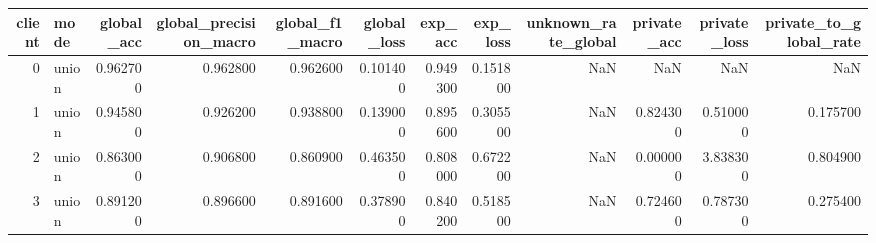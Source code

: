 \begin{tabular}{rlrrrrrrrrrr}
\toprule
client & mode & global_acc & global_precision_macro & global_f1_macro & global_loss & exp_acc & exp_loss & unknown_rate_global & private_acc & private_loss & private_to_global_rate \\
\midrule
0 & union & 0.962700 & 0.962800 & 0.962600 & 0.101400 & 0.949300 & 0.151800 & NaN & NaN & NaN & NaN \\
1 & union & 0.945800 & 0.926200 & 0.938800 & 0.139000 & 0.895600 & 0.305500 & NaN & 0.824300 & 0.510000 & 0.175700 \\
2 & union & 0.863000 & 0.906800 & 0.860900 & 0.463500 & 0.808000 & 0.672200 & NaN & 0.000000 & 3.838300 & 0.804900 \\
3 & union & 0.891200 & 0.896600 & 0.891600 & 0.378900 & 0.840200 & 0.518500 & NaN & 0.724600 & 0.787300 & 0.275400 \\
\bottomrule
\end{tabular}

